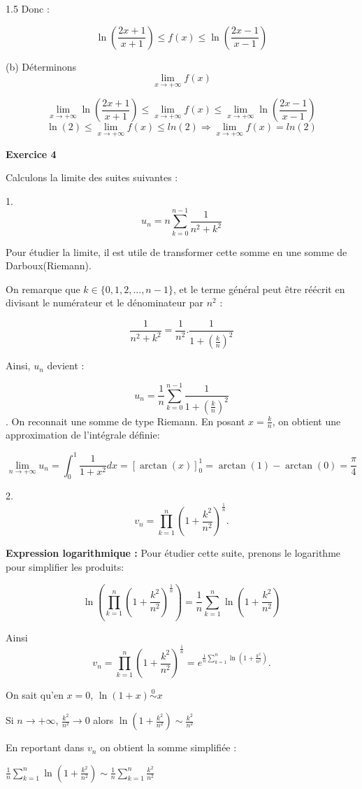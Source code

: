 \documentclass[12pt]{article}
\begin{document}
\begin{spacing}{1.5}
 Donc :
 
 \[\ln\left(\frac{2x+1}{x+1}\right)\leq f(x)\leq \ln\left(\frac{2x-1}{x-1}\right)\]
 
(b) Déterminons \[
\lim_{x\to +\infty}f(x)
\]

\[\lim_{x\to +\infty}\ln\left(\frac{2x+1}{x+1}\right)\leq \lim_{x\to +\infty}f(x)\leq \lim_{x\to +\infty}\ln\left(\frac{2x-1}{x-1}\right)\]
\[\ln(2)\leq \lim_{x\to +\infty}f(x)\leq ln(2)\Rightarrow \lim_{x\to +\infty}f(x)=ln(2)\]

\medskip
\textbf{Exercice 4}

Calculons la limite des suites suivantes :

1. \[
u_n=n\sum_{k=0}^{n-1}\frac{1}{n^2+k^2}
\]

Pour étudier la limite, il est utile de transformer cette somme en une somme de Darboux(Riemann).

On remarque que $k\in \{0,1,2,...,n-1\}$,  et le terme général peut être réécrit en divisant le numérateur et le dénominateur par $n^2$ :

\[\frac{1}{n^2+k^2}=\frac{1}{n^2}.\frac{1}{1+(\frac{k}{n})^2}\]

Ainsi, $u_n$ devient :

\[u_n=\frac{1}{n}\sum_{k=0}^{n-1}\frac{1}{1+(\frac{k}{n})^2}\]. On reconnait une somme de type Riemann. En posant $x=\frac{k}{n}$, on obtient une approximation de l'intégrale définie:

\[\lim_{n\to +\infty} u_n=\int_0^1\frac{1}{1+x^2}dx=[\arctan(x)]_0^1=\arctan(1)-\arctan(0)=\frac{\pi}{4}\]


2. \[
v_n=\prod_{k=1}^{n}\left(1+\frac{k^2}{n^2}\right)^{\frac{1}{n}}.
\]

\textbf{Expression logarithmique :} Pour étudier cette suite, prenons le logarithme pour simplifier les produits:

\[\ln\left(\prod_{k=1}^{n}\left(1+\frac{k^2}{n^2}\right)^{\frac{1}{n}}\right)=\frac{1}{n}\sum_{k=1}^n\ln\left(1+\frac{k^2}{n^2}\right)\]

Ainsi 
\[
v_n=\prod_{k=1}^{n}\left(1+\frac{k^2}{n^2}\right)^{\frac{1}{n}}= e^{\frac{1}{n}\sum_{k=1}^n\ln\left(1+\frac{k^2}{n^2}\right)}.
\]

On sait qu'en $x=0$, $ \ln(1+x) \stackrel{ 0 }{\sim} x $

Si $n\to +\infty$, $\frac{k^2}{n^2}\to 0$ alors $\ln(1+\frac{k^2}{n^2})\sim \frac{k^2}{n^2}$


En reportant dans $v_n$ on obtient la somme simplifiée :

$\frac{1}{n}\sum_{k=1}^n\ln\left(1+\frac{k^2}{n^2}\right)\sim \frac{1}{n}\sum_{k=1}^n\frac{k^2}{n^2}$


\end{spacing}
\end{document}
